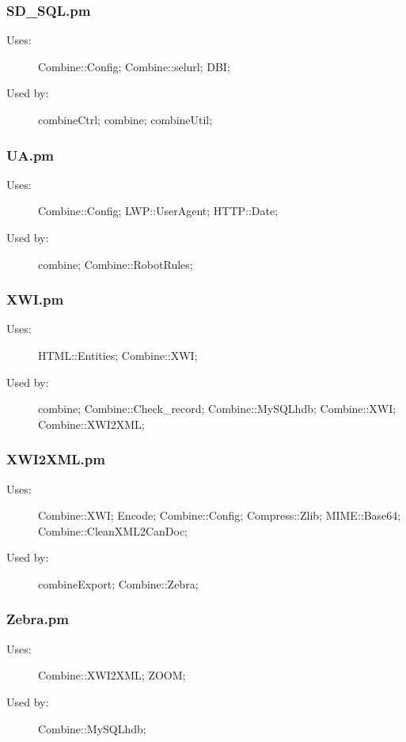 \subsubsection{SD\_SQL.pm}
\begin{description}
\item[Uses:] Combine::Config; Combine::selurl; DBI; 

\item[Used by:] combineCtrl; combine; combineUtil; 

\end{description}
\subsubsection{UA.pm}
\begin{description}
\item[Uses:] Combine::Config; LWP::UserAgent; HTTP::Date; 

\item[Used by:] combine; Combine::RobotRules; 

\end{description}
\subsubsection{XWI.pm}
\begin{description}
\item[Uses:] HTML::Entities; Combine::XWI; 

\item[Used by:] combine; Combine::Check\_record; Combine::MySQLhdb; Combine::XWI; Combine::XWI2XML; 

\end{description}
\subsubsection{XWI2XML.pm}
\begin{description}
\item[Uses:] Combine::XWI; Encode; Combine::Config; Compress::Zlib; MIME::Base64; Combine::CleanXML2CanDoc; 

\item[Used by:] combineExport; Combine::Zebra; 

\end{description}
\subsubsection{Zebra.pm}
\begin{description}
\item[Uses:] Combine::XWI2XML; ZOOM; 

\item[Used by:] Combine::MySQLhdb; 

\end{description}
